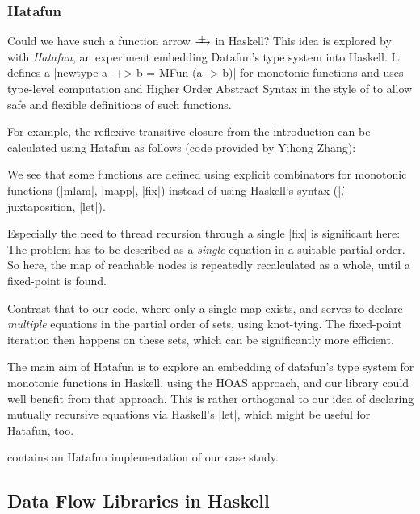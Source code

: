 \documentclass[manuscript,screen,acmsmall,nonacm]{acmart}
\begin{document}
\subsubsection{Hatafun}\label{sec:hatafun}

Could we have such a function arrow $\mfun$ in Haskell? This idea is explored by \citet{hatafun} with \emph{Hatafun}, an experiment embedding Datafun's type system into Haskell. It defines a |newtype a -+> b = MFun (a -> b)| for monotonic functions and uses type-level computation and Higher Order Abstract Syntax in the style of \citet{polakow} to allow safe and flexible definitions of such functions.

For example, the reflexive transitive closure from the introduction can be calculated using Hatafun as follows (code provided by Yihong Zhang):


We see that some functions are defined using explicit combinators for monotonic functions (|mlam|, |mapp|, |fix|) instead of using Haskell's syntax (|\|, juxtaposition, |let|).

Especially the need to thread recursion through a single |fix| is significant here: The problem has to be described as a \emph{single} equation in a suitable partial order. So here, the map of reachable nodes is repeatedly recalculated as a whole, until a fixed-point is found.

Contrast that to our code, where only a single map exists, and serves to declare \emph{multiple} equations in the partial order of sets, using knot-tying. The fixed-point iteration then happens on these sets, which can be significantly more efficient.

The main aim of Hatafun is to explore an embedding of datafun's type system for monotonic functions in Haskell, using the HOAS approach, and our library could well benefit from that approach. This is rather orthogonal to our idea of declaring mutually recursive equations via Haskell's |let|, which might be useful for Hatafun, too.

 contains an Hatafun implementation of our case study.

\subsection{Data Flow Libraries in Haskell}\label{sec:datafix}
\end{document}
